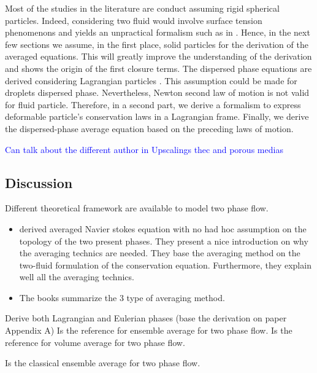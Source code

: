 Most of the studies in the literature are conduct assuming rigid spherical particles.
Indeed, considering two fluid would involve surface tension phenomenons and yields an unpractical formalism such as in \citet{drew1983mathematical}.
Hence, in the next few sections we assume, in the first place, solid particles for the derivation of the averaged equations.
This will greatly improve the understanding of the derivation and shows the origin of the first closure terms. 
The dispersed phase equations are derived considering Lagrangian particles \citep{jackson1997locally}. 
This assumption could be made for droplets dispersed phase.
Nevertheless, Newton second law of motion is not valid for fluid particle. 
Therefore, in a second part, we derive a formalism to express deformable particle's conservation laws in a Lagrangian frame. 
Finally, we derive the dispersed-phase average equation based on the preceding laws of motion.

\textcolor{blue}{Can talk about the different author in Upscalings thec and porous medias}

\subsection{Discussion}

Different theoretical framework are available to model two phase flow. 
\begin{itemize}
    \item \citet{drew1983mathematical} derived averaged Navier stokes equation with no had hoc assumption on the topology of the two present phases.  
    They present a nice introduction on why the averaging technics are needed. 
    They base the averaging method on the two-fluid formulation of the conservation equation.
    Furthermore, they explain well all the averaging technics. 
\end{itemize}
\begin{itemize}
    \item The books \citet{morel2015mathematical} summarize the 3 type of averaging method. 
\end{itemize}
Derive both Lagrangian and Eulerian phases (base the derivation on \citet{nott2011suspension} paper Appendix A)
\citet{batchelor1970stress}
Is the reference for ensemble average for two phase flow. 
\citet{jackson1997locally}
Is the reference for volume average for two phase flow. 

\citet{zhang1994averaged}
Is the classical ensemble average for two phase flow. 

